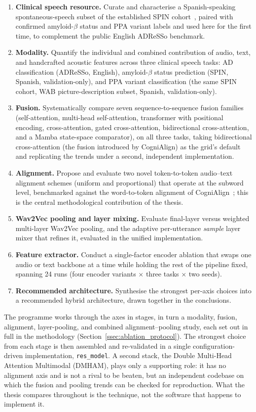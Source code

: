 \begin{enumerate}
    \item \textbf{Clinical speech resource.} Curate and characterise a Spanish-speaking spontaneous-speech subset of the established SPIN cohort~\cite{alcolea2019spin}, paired with confirmed amyloid-$\beta$ status and PPA variant labels and used here for the first time, to complement the public English ADReSSo benchmark.
    \item \textbf{Modality.} Quantify the individual and combined contribution of audio, text, and handcrafted acoustic features across three clinical speech tasks: AD classification (ADReSSo, English), amyloid-$\beta$ status prediction (SPIN, Spanish, validation-only), and PPA variant classification (the same SPIN cohort, WAB picture-description subset, Spanish, validation-only).
    \item \textbf{Fusion.} Systematically compare seven sequence-to-sequence fusion families (self-attention, multi-head self-attention, transformer with positional encoding, cross-attention, gated cross-attention, bidirectional cross-attention, and a Mamba state-space comparator), on all three tasks, taking bidirectional cross-attention (the fusion introduced by CogniAlign) as the grid's default and replicating the trends under a second, independent implementation.
    \item \textbf{Alignment.} Propose and evaluate two novel token-to-token audio--text alignment schemes (uniform and proportional) that operate at the subword level, benchmarked against the word-to-token alignment of CogniAlign~\cite{ortiz2025cognialign}; this is the central methodological contribution of the thesis.
    \item \textbf{Wav2Vec pooling and layer mixing.} Evaluate final-layer versus weighted multi-layer Wav2Vec pooling, and the adaptive per-utterance \emph{sample} layer mixer that refines it, evaluated in the unified implementation.
    \item \textbf{Feature extractor.} Conduct a single-factor encoder ablation that swaps one audio or text backbone at a time while holding the rest of the pipeline fixed, spanning 24 runs (four encoder variants $\times$ three tasks $\times$ two seeds).
    \item \textbf{Recommended architecture.} Synthesise the strongest per-axis choices into a recommended hybrid architecture, drawn together in the conclusions.
\end{enumerate}

The programme works through the axes in stages, in turn a modality, fusion, alignment, layer-pooling, and combined alignment--pooling study, each set out in full in the methodology (Section~\ref{ssec:ablation_protocol}). The strongest choice from each stage is then assembled and re-validated in a single configuration-driven implementation, \texttt{res\_model}. A second stack, the Double Multi-Head Attention Multimodal (DMHAM), plays only a supporting role: it has no alignment axis and is not a rival to be beaten, but an independent codebase on which the fusion and pooling trends can be checked for reproduction. What the thesis compares throughout is the technique, not the software that happens to implement it.

